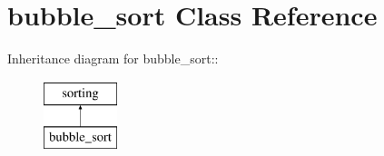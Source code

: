 \hypertarget{classbubble__sort}{
\section{bubble\_\-sort Class Reference}
\label{dc/d2f/classbubble__sort}
}
Inheritance diagram for bubble\_\-sort::\begin{figure}[H]
\begin{center}
\leavevmode
\includegraphics[height=2cm]{dc/d2f/classbubble__sort}
\end{center}
\end{figure}
